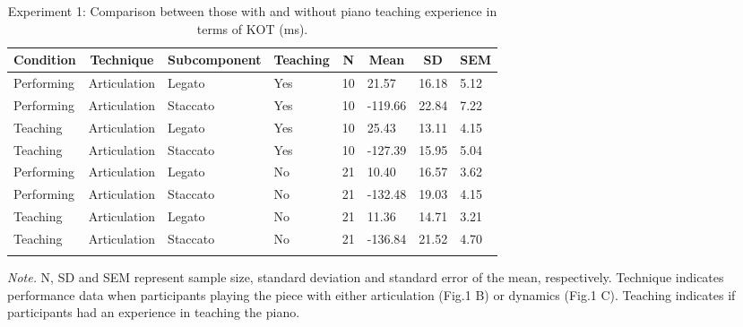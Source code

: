 \documentclass[
  man,floatsintext]{apa6}
\begin{document}
\begin{table}[tbp]

\begin{center}
\begin{threeparttable}

\caption{\label{tab:art-teaching-desc-1}Experiment 1: Comparison between those with and without piano teaching experience in terms of KOT (ms).}

\begin{tabular}{llllllll}
\toprule
Condition & \multicolumn{1}{c}{Technique} & \multicolumn{1}{c}{Subcomponent} & \multicolumn{1}{c}{Teaching} & \multicolumn{1}{c}{N} & \multicolumn{1}{c}{Mean} & \multicolumn{1}{c}{SD} & \multicolumn{1}{c}{SEM}\\
\midrule
Performing & Articulation & Legato & Yes & 10 & 21.57 & 16.18 & 5.12\\
Performing & Articulation & Staccato & Yes & 10 & -119.66 & 22.84 & 7.22\\
Teaching & Articulation & Legato & Yes & 10 & 25.43 & 13.11 & 4.15\\
Teaching & Articulation & Staccato & Yes & 10 & -127.39 & 15.95 & 5.04\\
Performing & Articulation & Legato & No & 21 & 10.40 & 16.57 & 3.62\\
Performing & Articulation & Staccato & No & 21 & -132.48 & 19.03 & 4.15\\
Teaching & Articulation & Legato & No & 21 & 11.36 & 14.71 & 3.21\\
Teaching & Articulation & Staccato & No & 21 & -136.84 & 21.52 & 4.70\\
\bottomrule
\addlinespace
\end{tabular}

\begin{tablenotes}[para]
\normalsize{\textit{Note.} N, SD and SEM represent sample size, standard deviation and standard error of the mean, respectively. Technique indicates performance data when participants playing the piece with either articulation (Fig.1 B) or dynamics (Fig.1 C). Teaching indicates if participants had an experience in teaching the piano.}
\end{tablenotes}

\end{threeparttable}
\end{center}

\end{table}
\end{document}
